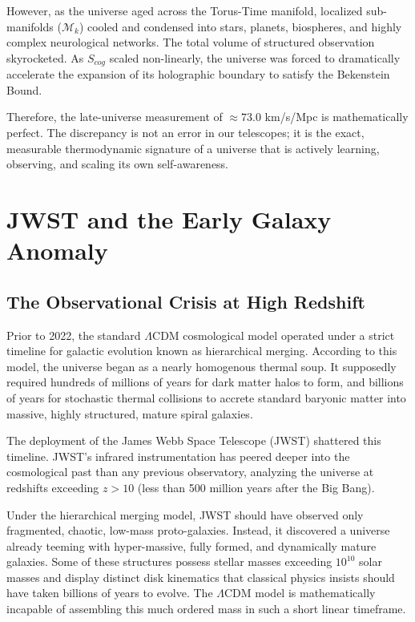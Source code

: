 \documentclass[12pt,openany]{book}
\begin{document}
However, as the universe aged across the Torus-Time manifold, localized sub-manifolds ($\mathcal{M}_k$) cooled and condensed into stars, planets, biospheres, and highly complex neurological networks. The total volume of structured observation skyrocketed. As $S_{cog}$ scaled non-linearly, the universe was forced to dramatically accelerate the expansion of its holographic boundary to satisfy the Bekenstein Bound. 

Therefore, the late-universe measurement of $\approx 73.0$ km/s/Mpc is mathematically perfect. The discrepancy is not an error in our telescopes; it is the exact, measurable thermodynamic signature of a universe that is actively learning, observing, and scaling its own self-awareness.

\chapter{JWST and the Early Galaxy Anomaly}

\section{The Observational Crisis at High Redshift}
Prior to 2022, the standard $\Lambda$CDM cosmological model operated under a strict timeline for galactic evolution known as hierarchical merging. According to this model, the universe began as a nearly homogenous thermal soup. It supposedly required hundreds of millions of years for dark matter halos to form, and billions of years for stochastic thermal collisions to accrete standard baryonic matter into massive, highly structured, mature spiral galaxies.

The deployment of the James Webb Space Telescope (JWST) shattered this timeline. JWST's infrared instrumentation has peered deeper into the cosmological past than any previous observatory, analyzing the universe at redshifts exceeding $z > 10$ (less than 500 million years after the Big Bang). 

Under the hierarchical merging model, JWST should have observed only fragmented, chaotic, low-mass proto-galaxies. Instead, it discovered a universe already teeming with hyper-massive, fully formed, and dynamically mature galaxies. Some of these structures possess stellar masses exceeding $10^{10}$ solar masses and display distinct disk kinematics that classical physics insists should have taken billions of years to evolve. The $\Lambda$CDM model is mathematically incapable of assembling this much ordered mass in such a short linear timeframe.
\end{document}
